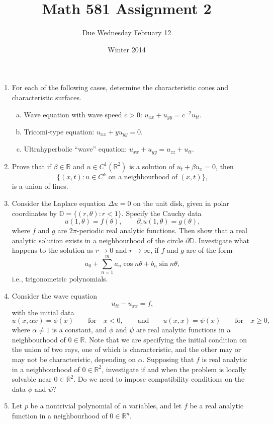 \documentclass[11pt]{amsart}
\title{Math 581 Assignment 2}
\author{Due Wednesday February 12}
\date{Winter 2014}                                           %
\newcommand{\R}{\mathbb{R}}
\begin{document}
\maketitle

\begin{enumerate}[1.]
\item
For each of the following cases, determine the characteristic cones and characteristic surfaces.
\begin{enumerate}[a)]
\item
Wave equation with wave speed $c>0$: $u_{xx}+u_{yy}=c^{-2}u_{tt}$.
\item
Tricomi-type equation: $u_{xx}+yu_{yy}=0$.
\item
Ultrahyperbolic ``wave'' equation: $u_{xx}+u_{yy}=u_{zz}+u_{tt}$.
\end{enumerate}
\item
Prove that if $\beta\in\R$ and $u\in C^1(\R^2)$ is a solution of $u_t+\beta u_x=0$,
then 
$$
\{(x,t):u\in C^k \textrm{ on a neighbourhood of }(x,t)\},
$$ 
is a union of lines.
\item
Consider the Laplace equation $\Delta u=0$ on the unit disk, given in polar coordinates by $\mathbb{D}=\{(r,\theta):r<1\}$.
Specify the Cauchy data
$$
u(1,\theta)=f(\theta),\qquad
\partial_ru(1,\theta)=g(\theta),
$$
where $f$ and $g$ are $2\pi$-periodic real analytic functions.
Then show that a real analytic solution exists in a neighbourhood of the circle $\partial\mathbb{D}$.
Investigate what happens to the solution as $r\to0$ and $r\to\infty$, if $f$ and $g$ are of the form
$$
a_0+\sum_{n=1}^{m} a_n\cos n\theta + b_n\sin n\theta,
$$
i.e., trigonometric polynomials.
\item
Consider the wave equation
$$
u_{tt} - u_{xx} = f ,
$$
with the initial data
$$
u(x,\alpha x) = \phi(x)
\qquad\textrm{for}\quad x<0,
\qquad\textrm{and}\qquad
u(x,x) = \psi(x)
\qquad\textrm{for}\quad x\geq0,
$$
where $\alpha\neq1$ is a constant, and $\phi$ and $\psi$ are real analytic functions in a neighbourhood of $0\in\R$.
Note that we are specifying the initial condition on the union of two rays, one of which is characteristic, and the other may or may not be characteristic, depending on $\alpha$.
Supposing that $f$ is real analytic in a neighbourhood of $0\in\R^2$, 
investigate if and when the problem is locally solvable near $0\in\R^2$.
Do we need to impose compatibility conditions on the data $\phi$ and $\psi$?
\item
Let $p$ be a nontrivial polynomial of $n$ variables, and let $f$ be a real analytic function in a neighbourhood of $0\in\R^n$.

\end{enumerate}
\end{document}
